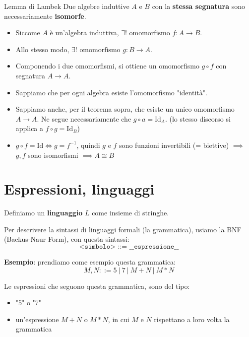 \documentclass[a4paper,11pt]{report}
\begin{document}
\begin{thmbox}{Lemma di Lambek}{}
    Due algebre induttive \( A \) e \( B \) con la \textbf{stessa segnatura} sono necessariamente \textbf{isomorfe}.

    \begin{proofbox}{}
        \begin{itemize}
            \item Siccome \( A \) è un'algebra induttiva, \( \exists! \text{ omomorfismo } f : A \to B \). 
            \item Allo stesso modo, \( \exists! \text{ omomorfismo } g : B \to A \).
            \item Componendo i due omomorfismi, si ottiene un omomorfismo \( g \circ f \) con segnatura \( A \to A \). 

            \item Sappiamo che per ogni algebra esiste l'omomorfismo "identità".
            \item Sappiamo anche, per il teorema sopra, che esiste un unico omomorfismo \( A \to A \). 
                \subitem Ne segue necessariamente che \( g \circ a = \text{Id}_A \). {\small (lo stesso discorso si applica a \( f \circ g = \text{Id}_B \))}

            \item  \( g \circ f = \text{Id} \iff g = f^{-1}\), quindi \( g \) e \( f \) sono funzioni invertibili (= biettive) \( \implies \) \( g, f \) sono isomorfismi \( \implies A \cong B\)  

        \end{itemize}

    \end{proofbox}

\end{thmbox}


\chapter{Espressioni, linguaggi}

Definiamo un \textbf{linguaggio} \( L \) come insieme di stringhe. 

Per descrivere la sintassi di linguaggi formali (la grammatica), usiamo la BNF (Backus-Naur Form), con questa sintassi:
\[
    \texttt{<simbolo> ::= \_\_espressione\_\_}
\]

\textbf{Esempio}:
prendiamo come esempio questa grammatica:
\[
    M, N ::= 5 \ | \ 7 \ | \ M + N \ | \ M * N
\]

Le espressioni che seguono questa grammatica, sono del tipo:
\begin{itemize}
    \item "5" o "7" 
    \item un'espressione \( M+N \) o \( M*N \), in cui \( M \) e \( N \) rispettano a loro volta la grammatica
\end{itemize}
\end{document}
